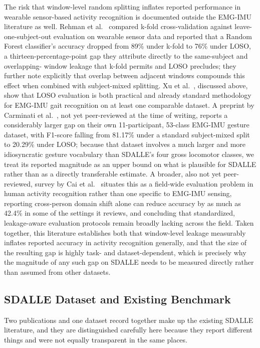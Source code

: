 \documentclass[conference]{IEEEtran}
\begin{document}
The risk that window-level random splitting inflates reported
performance in wearable sensor-based activity recognition is
documented outside the EMG-IMU literature as well. Rehman et
al.~\cite{rehman2024validation} compared k-fold cross-validation
against leave-one-subject-out evaluation on wearable sensor data and
reported that a Random Forest classifier's accuracy dropped from
89\% under k-fold to 76\% under LOSO, a thirteen-percentage-point
gap they attribute directly to the same-subject and overlapping-
window leakage that k-fold permits and LOSO precludes; they further
note explicitly that overlap between adjacent windows compounds this
effect when combined with subject-mixed splitting. Xu et
al.~\cite{xu2026dsaf}, discussed above, show that LOSO evaluation is
both practical and already standard methodology for EMG-IMU gait
recognition on at least one comparable dataset. A preprint by
Carminati et al.~\cite{carminati2026personalization}, not yet
peer-reviewed at the time of writing, reports a considerably larger
gap on their own 11-participant, 53-class EMG-IMU gesture dataset,
with F1-score falling from 81.17\% under a standard subject-mixed
split to 20.29\% under LOSO; because that dataset involves a much
larger and more idiosyncratic gesture vocabulary than SDALLE's four
gross locomotor classes, we treat its reported magnitude as an upper
bound on what is plausible for SDALLE rather than as a directly
transferable estimate. A broader, also not yet peer-reviewed, survey
by Cai et al.~\cite{cai2025generalizablehar} situates this as a
field-wide evaluation problem in human activity recognition rather
than one specific to EMG-IMU sensing, reporting cross-person domain
shift alone can reduce accuracy by as much as 42.4\% in some of the
settings it reviews, and concluding that standardized,
leakage-aware evaluation protocols remain broadly lacking across the
field. Taken together, this literature establishes both that
window-level leakage measurably inflates reported accuracy in
activity recognition generally, and that the size of the resulting
gap is highly task- and dataset-dependent, which is precisely why
the magnitude of any such gap on SDALLE needs to be measured
directly rather than assumed from other datasets.

\subsection{SDALLE Dataset and Existing Benchmark}
\label{subsec:sdalle-related}

Two publications and one dataset record together make up the
existing SDALLE literature, and they are distinguished carefully
here because they report different things and were not equally
transparent in the same places.
\end{document}
